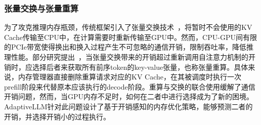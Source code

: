 \subsubsection{张量交换与张量重算}

为了攻克推理内存瓶颈，传统框架引入了张量交换技术~\cite{Swapping, vLLM, LightLLM}，将暂时不会使用的KV Cache传输至CPU中，在计算需要时重新传输至GPU中。然而，CPU-GPU间有限的PCIe带宽使得换出和换入过程产生不可忽略的通信开销，限制吞吐率，降低推理性能。部分研究提出~\cite{Recomputation}，当张量交换带来的开销超过重新调用自注意力机制的开销时，应选择后者来获取所有前序token的key-value张量，也称张量重算。具体来说，内存管理器直接删除重算请求对应的KV Cache，在其被调度时执行一次prefill阶段来代替原本应该执行的decode阶段。重算与交换的联合使用缓解了通信开销问题，然而，当GPU内存不足时，如何在二者中进行选择成为了新的困境。AdaptiveLLM针对此问题设计了基于开销感知的内存优化策略，能够预测二者的开销，并选择开销小的过程执行。








